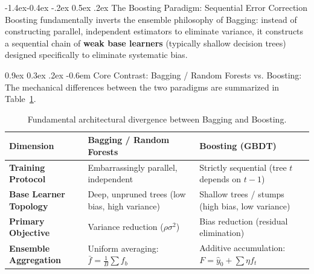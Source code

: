 \documentclass[11pt,a4paper]{article}
\makeatletter
\renewcommand\subsection{\@startsection{subsection}{2}{\z@}%
                                     {-1.4ex\@plus -0.4ex \@minus -.2ex}%
                                     {0.5ex \@plus .2ex}%
                                     {\normalfont\normalsize\bfseries}}
\renewcommand\paragraph{\@startsection{paragraph}{4}{\z@}%
                                     {0.9ex \@plus0.3ex \@minus.2ex}%
                                     {-0.6em}%
                                     {\normalfont\normalsize\bfseries}}
\makeatother
\begin{document}
\subsection{The Boosting Paradigm: Sequential Error Correction}
\label{sec:boosting_residuals}
Boosting fundamentally inverts the ensemble philosophy of Bagging: instead of constructing parallel, independent estimators to eliminate variance, it constructs a sequential chain of \textbf{weak base learners} (typically shallow decision trees) designed specifically to eliminate systematic bias.

\paragraph{Core Contrast: Bagging / Random Forests vs. Boosting:}
The mechanical differences between the two paradigms are summarized in Table~\ref{tab:bagging_vs_boosting}.

\begin{table}[!htbp]
\centering
\small
\begin{tabular}{@{}p{4.2cm}p{5.3cm}p{5.3cm}@{}}
\toprule
\textbf{Dimension} & \textbf{Bagging / Random Forests} & \textbf{Boosting (GBDT)} \\ \midrule
\textbf{Training Protocol}       & Embarrassingly parallel, independent & Strictly sequential (tree $t$ depends on $t-1$) \\
\textbf{Base Learner Topology}   & Deep, unpruned trees (low bias, high variance) & Shallow trees / stumps (high bias, low variance) \\
\textbf{Primary Objective}       & Variance reduction ($\rho \sigma^2$) & Bias reduction (residual elimination) \\
\textbf{Ensemble Aggregation}    & Uniform averaging: $\bar{f} = \frac{1}{B}\sum f_b$ & Additive accumulation: $F = \hat{y}_0 + \sum \eta f_t$ \\ \bottomrule
\end{tabular}
\caption{Fundamental architectural divergence between Bagging and Boosting.}
\label{tab:bagging_vs_boosting}
\end{table}
\end{document}
